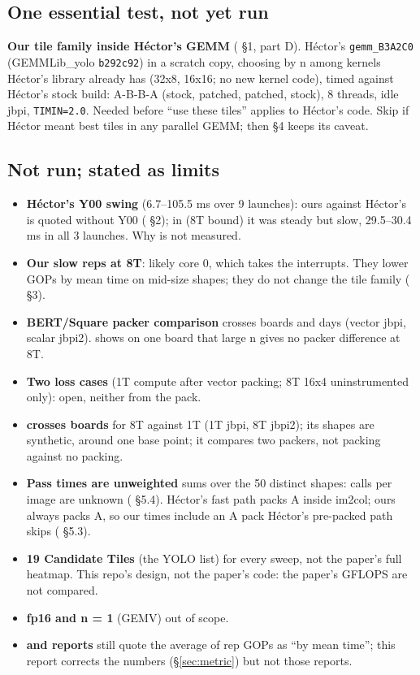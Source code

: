 \subsection*{One essential test, not yet run}
\textbf{Our tile family inside H\'ector's GEMM} ( \S1,  part D). H\'ector's \texttt{gemm\_B3A2C0} (GEMMLib\_yolo \texttt{b292c92}) in a scratch copy, choosing by n among kernels H\'ector's library already has (32x8, 16x16; no new kernel code), timed against H\'ector's stock build: A-B-B-A (stock, patched, patched, stock), 8 threads, idle jbpi, \texttt{TIMIN=2.0}. Needed before ``use these tiles'' applies to H\'ector's code. Skip if H\'ector meant best tiles in any parallel GEMM; then \S4 keeps its caveat.

\subsection*{Not run; stated as limits}
\begin{itemize}\setlength\itemsep{1pt}
\item \textbf{H\'ector's Y00 swing} (6.7--105.5 ms over 9 launches): ours against H\'ector's is quoted without Y00 ( \S2); in  (8T bound) it was steady but slow, 29.5--30.4 ms in all 3 launches. Why is not measured.
\item \textbf{Our slow reps at 8T}: likely core 0, which takes the interrupts. They lower GOPs by mean time on mid-size shapes; they do not change the tile family ( \S3).
\item \textbf{BERT/Square packer comparison} crosses boards and days (vector jbpi, scalar jbpi2).  shows on one board that large n gives no packer difference at 8T.
\item \textbf{Two  loss cases} (1T compute after vector packing; 8T 16x4 uninstrumented only): open, neither from the pack.
\item \textbf{ crosses boards} for 8T against 1T (1T jbpi, 8T jbpi2); its shapes are synthetic, around one base point; it compares two packers, not packing against no packing.
\item \textbf{Pass times are unweighted} sums over the 50 distinct shapes: calls per image are unknown ( \S5.4). H\'ector's fast path packs A inside im2col; ours always packs A, so our times include an A pack H\'ector's pre-packed path skips ( \S5.3).
\item \textbf{19 Candidate Tiles} (the YOLO list) for every sweep, not the paper's full heatmap. This repo's design, not the paper's code: the paper's GFLOPS are not compared.
\item \textbf{fp16 and n = 1} (GEMV) out of scope.
\item \textbf{ and  reports} still quote the average of rep GOPs as ``by mean time''; this report corrects the numbers (\S\ref{sec:metric}) but not those reports.
\end{itemize}
